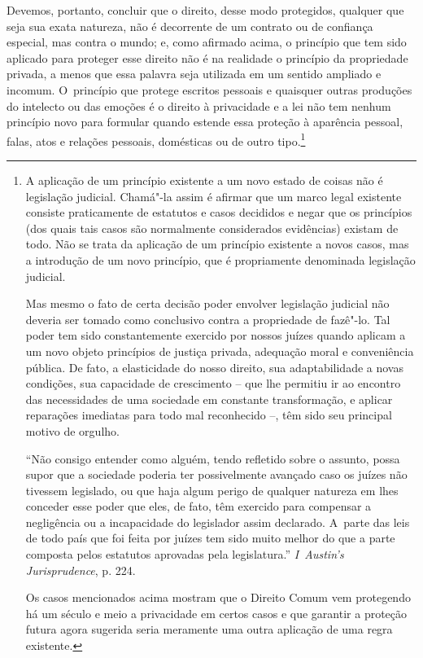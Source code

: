 Devemos, portanto, concluir que o direito, desse modo protegidos,
qualquer que seja sua exata natureza, não é decorrente de um contrato ou
de confiança especial, mas contra o mundo; e, como afirmado acima, o
princípio que tem sido aplicado para proteger esse direito não é na
realidade o princípio da propriedade privada, a menos que essa palavra
seja utilizada em um sentido ampliado e incomum. O~princípio que protege
escritos pessoais e quaisquer outras produções do intelecto ou das
emoções é o direito à privacidade e a lei não tem nenhum princípio novo
para formular quando estende essa proteção à aparência pessoal, falas,
atos e relações pessoais, domésticas ou de outro tipo.\footnote{A
  aplicação de um princípio existente a um novo estado de coisas não é
  legislação judicial. Chamá"-la assim é afirmar que um marco legal
  existente consiste praticamente de estatutos e casos decididos e negar
  que os princípios (dos quais tais casos são normalmente considerados
  evidências) existam de todo. Não se trata da aplicação de um princípio
  existente a novos casos, mas a introdução de um novo princípio, que é
  propriamente denominada legislação judicial.

  Mas mesmo o fato de certa decisão poder envolver legislação judicial
  não deveria ser tomado como conclusivo contra a propriedade de
  fazê"-lo. Tal poder tem sido constantemente exercido por nossos juízes
  quando aplicam a um novo objeto princípios de justiça privada,
  adequação moral e conveniência pública. De fato, a elasticidade do
  nosso direito, sua adaptabilidade a novas condições, sua capacidade de
  crescimento -- que lhe permitiu ir ao encontro das necessidades de
  uma sociedade em constante transformação, e aplicar reparações
  imediatas para todo mal reconhecido --, têm sido seu principal motivo
  de orgulho.

  ``Não consigo entender como alguém, tendo refletido sobre o assunto,
  possa supor que a sociedade poderia ter possivelmente avançado caso os
  juízes não tivessem legislado, ou que haja algum perigo de qualquer
  natureza em lhes conceder esse poder que eles, de fato, têm exercido
  para compensar a negligência ou a incapacidade do legislador assim
  declarado. A~parte das leis de todo país que foi feita por juízes tem
  sido muito melhor do que a parte composta pelos estatutos aprovadas
  pela legislatura.'' \emph{I~Austin's Jurisprudence}, p. 224.

  Os casos mencionados acima mostram que o Direito Comum vem protegendo
  há um século e meio a privacidade em certos casos e que garantir a
  proteção futura agora sugerida seria meramente uma outra aplicação de
  uma regra existente.}


